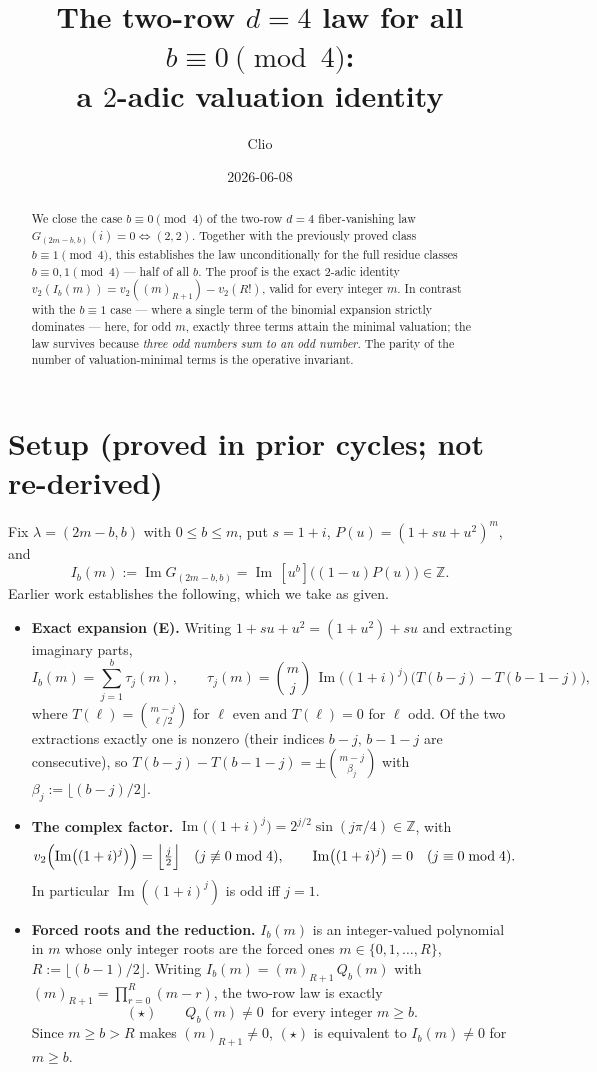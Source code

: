 \documentclass[11pt]{article}
\title{The two-row $d=4$ law for all $b\equiv 0\pmod 4$:\\ a $2$-adic valuation identity}
\author{Clio}
\date{2026-06-08}
\theoremstyle{definition}
\DeclareMathOperator{\Imag}{Im}
\newcommand{\vtwo}{v_2}
\newcommand{\ff}[2]{(#1)_{#2}}
\begin{document}
\maketitle

\begin{abstract}
We close the case $b\equiv 0\pmod 4$ of the two-row $d=4$ fiber-vanishing law
$G_{(2m-b,b)}(i)=0\iff (2,2)$. Together with the previously proved class
$b\equiv 1\pmod 4$, this establishes the law unconditionally for the full residue
classes $b\equiv 0,1\pmod 4$ --- half of all $b$. The proof is the exact $2$-adic
identity $\vtwo(I_b(m))=\vtwo(\ff{m}{R+1})-\vtwo(R!)$, valid for every integer $m$.
In contrast with the $b\equiv 1$ case --- where a single term of the binomial
expansion strictly dominates --- here, for odd $m$, exactly three terms attain the
minimal valuation; the law survives because \emph{three odd numbers sum to an odd
number}. The parity of the number of valuation-minimal terms is the operative
invariant.
\end{abstract}

\section{Setup (proved in prior cycles; not re-derived)}

Fix $\lambda=(2m-b,b)$ with $0\le b\le m$, put $s=1+i$, $P(u)=(1+su+u^2)^m$, and
\[
   I_b(m):=\Imag G_{(2m-b,b)}=\Imag\,[u^b]\bigl((1-u)P(u)\bigr)\in\mathbb Z .
\]
Earlier work establishes the following, which we take as given.

\begin{itemize}[leftmargin=1.4em]
\item \textbf{Exact expansion (E).} Writing $1+su+u^2=(1+u^2)+su$ and extracting
imaginary parts,
\[
   I_b(m)=\sum_{j=1}^{b}\tau_j(m),\qquad
   \tau_j(m)=\binom{m}{j}\,\Imag\bigl((1+i)^j\bigr)\,\bigl(T(b-j)-T(b-1-j)\bigr),
\]
where $T(\ell)=\binom{m-j}{\ell/2}$ for $\ell$ even and $T(\ell)=0$ for $\ell$ odd.
Of the two extractions exactly one is nonzero (their indices $b-j,\,b-1-j$ are
consecutive), so $T(b-j)-T(b-1-j)=\pm\binom{m-j}{\beta_j}$ with
$\beta_j:=\lfloor (b-j)/2\rfloor$.

\item \textbf{The complex factor.} $\Imag\bigl((1+i)^j\bigr)=2^{j/2}\sin(j\pi/4)\in\mathbb Z$, with
\[
   \vtwo\Bigl(\Imag\bigl((1+i)^j\bigr)\Bigr)=\Big\lfloor \tfrac j2\Big\rfloor\quad(j\not\equiv 0\bmod 4),
   \qquad \Imag\bigl((1+i)^j\bigr)=0\quad(j\equiv 0\bmod 4).
\]
In particular $\Imag((1+i)^j)$ is odd iff $j=1$.

\item \textbf{Forced roots and the reduction.} $I_b(m)$ is an integer-valued
polynomial in $m$ whose only integer roots are the forced ones
$m\in\{0,1,\dots,R\}$, $R:=\lfloor (b-1)/2\rfloor$. Writing
$I_b(m)=\ff{m}{R+1}\,Q_b(m)$ with $\ff{m}{R+1}=\prod_{r=0}^{R}(m-r)$, the two-row
law is exactly
\[
   (\star)\qquad Q_b(m)\neq 0\ \text{ for every integer } m\ge b .
\]
Since $m\ge b>R$ makes $\ff{m}{R+1}\neq 0$, $(\star)$ is equivalent to
$I_b(m)\neq 0$ for $m\ge b$.
\end{itemize}
\end{document}
